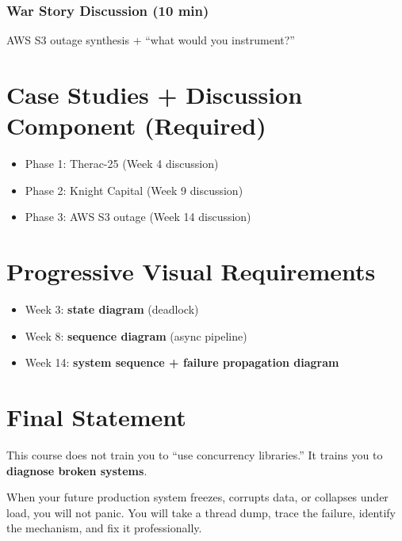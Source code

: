 \documentclass[11pt,a4paper]{article}
\begin{document}
	\subsubsection*{War Story Discussion (10 min)}
	AWS S3 outage synthesis + ``what would you instrument?''
	
	\section*{Case Studies + Discussion Component (Required)}
	\begin{itemize}[leftmargin=*]
		\item Phase 1: Therac-25 (Week 4 discussion)
		\item Phase 2: Knight Capital (Week 9 discussion)
		\item Phase 3: AWS S3 outage (Week 14 discussion)
	\end{itemize}
	
	\section*{Progressive Visual Requirements}
	\begin{itemize}[leftmargin=*]
		\item Week 3: \textbf{state diagram} (deadlock)
		\item Week 8: \textbf{sequence diagram} (async pipeline)
		\item Week 14: \textbf{system sequence + failure propagation diagram}
	\end{itemize}
	
	\section*{Final Statement}
	
	This course does not train you to ``use concurrency libraries.''  
	It trains you to \textbf{diagnose broken systems}.
	
	When your future production system freezes, corrupts data, or collapses under load, you will not panic.  
	You will take a thread dump, trace the failure, identify the mechanism, and fix it professionally.
	
\end{document}

